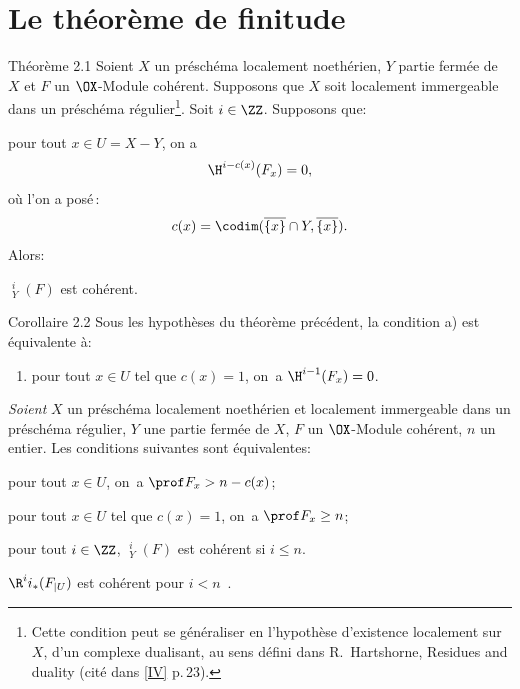 \section{Le th\'eor\`eme de finitude} \label{VIII.2}

\label{VIII.2.1}
\begin{enonce*}{Th\'eor\`eme 2.1\ndemark}
Soient $X$ un pr\'esch\'ema localement noeth\'erien, $Y$ partie ferm\'ee de $X$ et $F$ un $\OX$-Module coh\'erent.
Supposons que $X$ soit localement immergeable dans un pr\'esch\'ema r\'egulier\footnote{Cette condition peut se g\'en\'eraliser en l'hypoth\`ese d'existence localement sur $X$, d'un \og complexe dualisant\fg, au sens d\'efini dans R.\, Hartshorne, Residues and duality (cit\'e dans \Exp \ref{IV} p.\,23).}. Soit $i\in\ZZ$. Supposons que:
\begin{enumeratea}
\item
pour tout $x\in U=X-Y$, on a
\[
\H^{i-c(x)}({F}_x)=0,
\]
o\`u l'on a pos\'e\,:
\begin{equation} \label{eq:VIII.2.1} c(x)=\codim (\overline{\{x\}}\cap Y, \overline{\{x\}}).
\end{equation}
Alors:
\item
$\mathop{\underline{\mathrm{H}}}\nolimits^i_Y(F)$ est coh\'erent.
\end{enumeratea}
\end{enonce*}

\label{VIII.2.2}
\begin{enonce*}{Corollaire 2.2\ndemark}
Sous les hypoth\`eses du th\'eor\`eme pr\'ec\'edent, la condition \textup{a)} est \'equivalente \`a:

\begin{enumerate}
\item[\textup{c)}] pour tout $x\in U$ tel que $c(x)=1$, on~a $\H^{i-1}(F_x)=0$.
\end{enumerate}
\end{enonce*}

\begin{corollaire} \label{VIII.2.3} \emph{Soient} $X$ un pr\'esch\'ema localement noeth\'erien et localement immergeable dans un pr\'esch\'ema r\'egulier, $Y$ une partie ferm\'ee de $X$, $F$ un $\OX$-Module coh\'erent, $n$ un entier. Les conditions suivantes sont \'equivalentes:
\begin{enumeratei}
\item
pour tout $x\in U$, on~a $\prof F_x>n-c(x)$;
\item
pour tout $x\in U$ tel que $c(x)=1$, on~a $\prof F_x\geq n$;
\item
pour tout $i\in \ZZ$, $\mathop{\underline{\mathrm{H}}}\nolimits^i_Y(F)$ est coh\'erent si $i\leq n$.
\item
$\R^ii_\ast(F_{|U})$ est coh\'erent pour $i<n$\ .
\end{enumeratei}
\end{corollaire}

